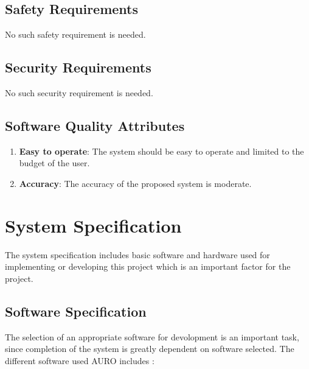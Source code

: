 \subsection*{Safety Requirements}
No such safety requirement is needed.

\subsection*{Security Requirements}
No such security requirement is needed.
\
\subsection*{Software Quality Attributes}
\begin{enumerate}
\item \textbf{Easy to operate}: The system should be easy to operate and limited to the budget of the user.
\item \textbf{Accuracy}: The accuracy of the proposed system is moderate.
\end{enumerate}

\section{System Specification}
The system specification includes basic software and hardware used for implementing or developing this project which is an important factor for the project.

\subsection{Software Specification}
The selection of an appropriate software for devolopment is an important task, since completion of the system is greatly dependent on software selected. The different software used AURO includes :
